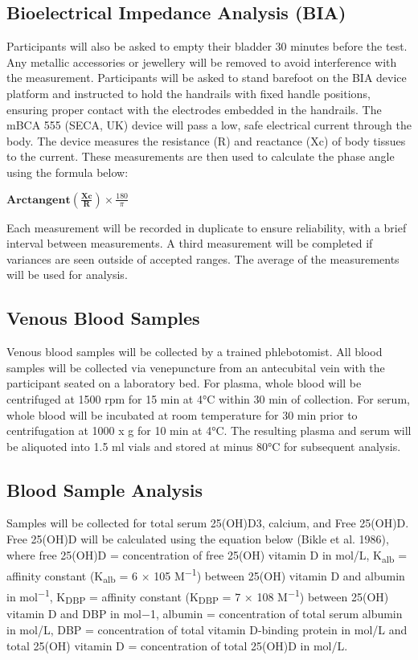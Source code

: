 \documentclass[
]{article}
\begin{document}
\subsection{Bioelectrical Impedance Analysis (BIA)}\label{bioelectrical-impedance-analysis-bia}

Participants will also be asked to empty their bladder 30 minutes before the test. Any metallic accessories or jewellery will be removed to avoid interference with the measurement. Participants will be asked to stand barefoot on the BIA device platform and instructed to hold the handrails with fixed handle positions, ensuring proper contact with the electrodes embedded in the handrails. The mBCA 555 (SECA, UK) device will pass a low, safe electrical current through the body. The device measures the resistance (R) and reactance (Xc) of body tissues to the current.
These measurements are then used to calculate the phase angle using the formula below:

\(\mathbf{Arctangent} \left( \frac{\mathbf{Xc}}{\mathbf{R}} \right) \times \frac{180}{\pi}\)

Each measurement will be recorded in duplicate to ensure reliability, with a brief interval between measurements. A third measurement will be completed if variances are seen outside of accepted ranges. The average of the measurements will be used for analysis.

\subsection{Venous Blood Samples}\label{venous-blood-samples}

Venous blood samples will be collected by a trained phlebotomist. All blood samples will be collected via venepuncture from an antecubital vein with the participant seated on a laboratory bed. For plasma, whole blood will be centrifuged at 1500 rpm for 15 min at 4°C within 30 min of collection. For serum, whole blood will be incubated at room temperature for 30 min prior to centrifugation at 1000 x g for 10 min at 4°C. The resulting plasma and serum will be aliquoted into 1.5 ml vials and stored at minus 80°C for subsequent analysis.

\subsection{Blood Sample Analysis}\label{blood-sample-analysis}

Samples will be collected for total serum 25(OH)D3, calcium, and Free 25(OH)D. Free 25(OH)D will be calculated using the equation below (Bikle et al. 1986), where free 25(OH)D = concentration of free 25(OH) vitamin D in mol/L, K\textsubscript{alb} = affinity constant (K\textsubscript{alb} = 6 × 105 M\textsuperscript{−1}) between 25(OH) vitamin D and albumin in mol\textsuperscript{−1}, K\textsubscript{DBP} = affinity constant (K\textsubscript{DBP} = 7 × 108 M\textsuperscript{−1}) between 25(OH) vitamin D and DBP in mol−1, albumin = concentration of total serum albumin in mol/L, DBP = concentration of total vitamin D-binding protein in mol/L and total 25(OH) vitamin D = concentration of total 25(OH)D in mol/L.
\end{document}
